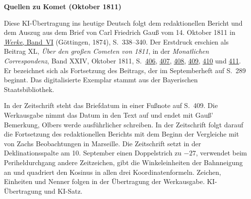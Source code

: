 \clearpage\thispagestyle{empty}
\begin{center}\textbf{Quellen zu Komet (Oktober 1811)}\end{center}
\noindent Diese KI-Übertragung ins heutige Deutsch folgt dem redaktionellen Bericht und dem Auszug aus dem Brief von Carl Friedrich Gauß vom 14. Oktober 1811 in \href{https://gdz.sub.uni-goettingen.de/id/PPN236007467}{\textit{Werke}, Band~VI} (Göttingen, 1874), S.~338--340. Der Erstdruck erschien als Beitrag XL, \textit{Über den großen Cometen von 1811}, in der \textit{Monatlichen Correspondenz}, Band XXIV, Oktober 1811, S.~\href{https://api.digitale-sammlungen.de/iiif/image/v2/bsb10538613_00418/full/1600,/0/default.jpg}{406}, \href{https://api.digitale-sammlungen.de/iiif/image/v2/bsb10538613_00419/full/1600,/0/default.jpg}{407}, \href{https://api.digitale-sammlungen.de/iiif/image/v2/bsb10538613_00420/full/1600,/0/default.jpg}{408}, \href{https://api.digitale-sammlungen.de/iiif/image/v2/bsb10538613_00421/full/1600,/0/default.jpg}{409}, \href{https://api.digitale-sammlungen.de/iiif/image/v2/bsb10538613_00422/full/1600,/0/default.jpg}{410} und \href{https://api.digitale-sammlungen.de/iiif/image/v2/bsb10538613_00423/full/1600,/0/default.jpg}{411}. Er bezeichnet sich als Fortsetzung des Beitrags, der im Septemberheft auf S.~289 beginnt. Das digitalisierte Exemplar stammt aus der Bayerischen Staatsbibliothek.
\par\smallskip\noindent In der Zeitschrift steht das Briefdatum in einer Fußnote auf S.~409. Die Werkausgabe nimmt das Datum in den Text auf und endet mit Gauß’ Bemerkung, Olbers werde ausführlicher schreiben. In der Zeitschrift folgt darauf die Fortsetzung des redaktionellen Berichts mit dem Beginn der Vergleiche mit von Zachs Beobachtungen in Marseille. Die Zeitschrift setzt in der Deklinationsspalte am 10. September einen Doppelstrich zu $-27$, verwendet beim Periheldurchgang andere Zeitzeichen, gibt die Winkeleinheiten der Bahnneigung an und quadriert den Kosinus in allen drei Koordinatenformeln. Zeichen, Einheiten und Nenner folgen in der Übertragung der Werkausgabe. KI-Übertragung und KI-Satz.
\clearpage

